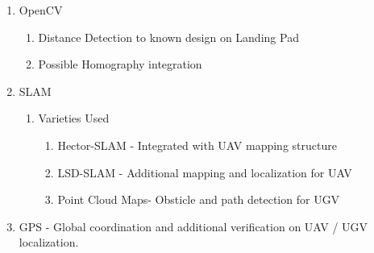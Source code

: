   \begin{enumerate}

    \item OpenCV
      \begin{enumerate}

        \item Distance Detection to known design on Landing Pad
        \item Possible Homography integration

      \end{enumerate}
    \item SLAM
      \begin{enumerate}

        \item Varieties Used
          \begin{enumerate}

            \item Hector-SLAM - Integrated with UAV mapping structure
            \item LSD-SLAM - Additional mapping and localization for UAV
            \item Point Cloud Maps- Obsticle and path detection for UGV

          \end{enumerate}
      \end{enumerate}

    \item GPS - Global coordination and additional verification on UAV / UGV localization.

  \end{enumerate}
